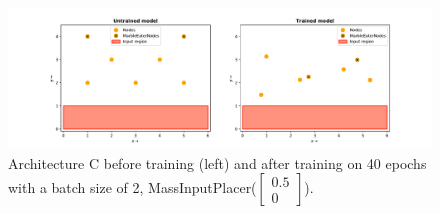 \begin{figure}[hb]
	\centering
	\includegraphics[scale=0.4]{figures/C_batch1_ConstVelInputPlacer([0.5, 0]])_epoch40.pdf}
	\caption{Architecture C before training (left) and after training on 40 epochs with 
		a batch size of 2, MassInputPlacer($\begin{bmatrix} 0.5\\0\end{bmatrix}$).}
	\label{fig:arch_c_const_vel_50pc_architecture}
\end{figure}

\clearpage